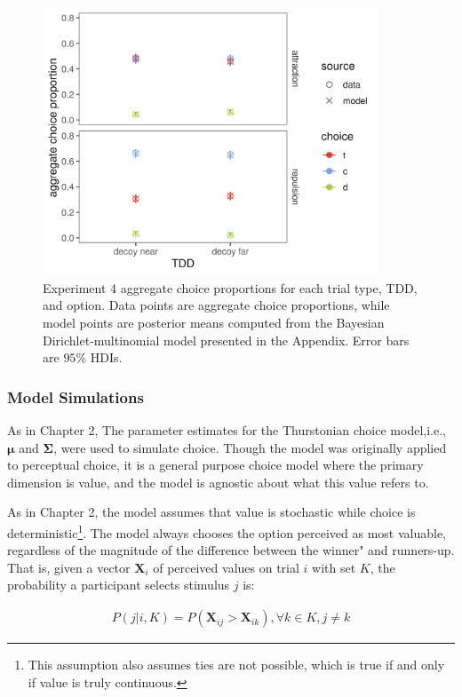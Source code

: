 \begin{figure}
    \includegraphics[scale=.5,width=100mm]{figures/bayes_choice_model_data_plot.jpeg}
    \caption{Experiment 4 aggregate choice proportions for each trial type, TDD, and option. Data points are aggregate choice proportions, while model points are posterior means computed from the Bayesian Dirichlet-multinomial model presented in the Appendix. Error bars are $95\%$ HDIs.}
    \label{fig:bayes_choice_model_data_plot}
\end{figure}

\subsubsection{Model Simulations}

As in Chapter 2, The parameter estimates for the Thurstonian choice model,i.e., $\boldsymbol{\mu}$ and $\boldsymbol{\Sigma}$, were used to simulate choice. Though the model was originally applied to perceptual choice, it is a general purpose choice model where the primary dimension is value, and the model is agnostic about what this value refers to. 

As in Chapter 2, the model assumes that value is stochastic while choice is deterministic\footnote{This assumption also assumes ties are not possible, which is true if and only if value is truly continuous.}. The model always chooses the option perceived as most valuable, regardless of the magnitude of the difference between the winner" and runners-up. That is, given a vector $\mathbf{X}_i$ of perceived values on trial $i$ with set $K$, the probability a participant selects stimulus $j$ is:

\begin{align}
   P(j|i,K)=P(\mathbf{X}_{ij}>\mathbf{X}_{ik}), \forall k \in K, j \neq k
   \label{eqn:pchoice_price}
\end{align}

